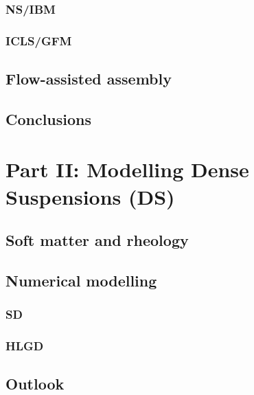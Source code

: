 \hypertarget{ibm}{%
  \subsubsection{NS/IBM}}

\hypertarget{icls}{%
  \subsubsection{ICLS/GFM}}

\hypertarget{assembly}{%
  \subsection{Flow-assisted assembly}}

\hypertarget{conclusion1}{%
  \subsection{Conclusions}}


\hypertarget{part2}{%
  \section{Part II: Modelling Dense Suspensions (DS)}}

\hypertarget{background2}{%
  \subsection{Soft matter and rheology}}

\hypertarget{simulation2}{%
  \subsection{Numerical modelling}}

\hypertarget{sd}{%
  \subsubsection{SD}}

\hypertarget{hlgd}{%
  \subsubsection{HLGD}}

\hypertarget{conclusion2}{%
  \subsection{Outlook}}

